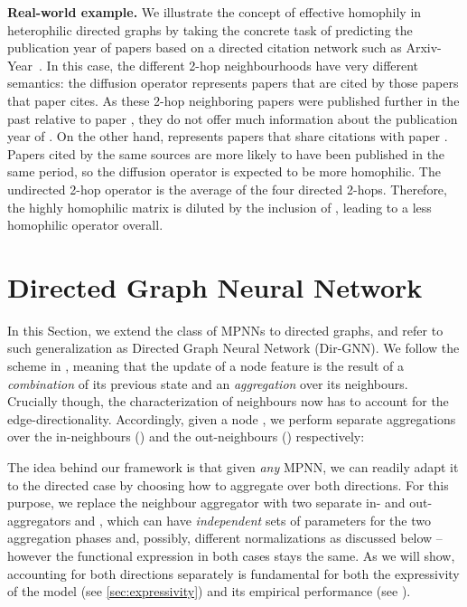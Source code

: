 \documentclass{article}
\newcommand\ours{Directed Graph Neural Network}
\newcommand\oursacro{Dir-GNN}
\theoremstyle{plain}
\theoremstyle{definition}
\theoremstyle{remark}
\begin{document}
\textbf{Real-world example.} We illustrate the concept of effective homophily in heterophilic directed graphs by taking the concrete task of predicting the publication year of papers based on a directed citation network such as Arxiv-Year~\cite{lim2021large}. 
In this case, the different 2-hop neighbourhoods have very different semantics: the diffusion operator  represents papers that are cited by those papers that paper  cites. As these 2-hop neighboring papers were published further in the past relative to paper , they do not offer much information about the publication year of .
On the other hand,  represents papers that share citations with paper . Papers cited by the same sources are more likely to have been published in the same period, so the diffusion operator  is expected to be more homophilic.
The undirected 2-hop operator  is the average of the four directed 2-hops. Therefore, the highly homophilic matrix  is diluted by the inclusion of , leading to a less homophilic operator overall.




 \section{\ours{}}
\label{sec:method}

In this Section, we extend the class of MPNNs to directed graphs, and refer to such generalization as \ours{} (\oursacro{}). We follow the scheme in , meaning that the update of a node feature is the result of a {\em combination} of its previous state and an {\em aggregation} over its neighbours. Crucially though, the characterization of neighbours now has to account for the edge-directionality. Accordingly, given a node , we perform separate aggregations over the in-neighbours () and the out-neighbours () respectively:

\noindent The idea behind our framework is that given {\em any} MPNN, we can readily adapt it to the directed case by choosing how to aggregate over both directions. For this purpose, we replace the neighbour aggregator  with two separate in- and out-aggregators  and , which can have {\em independent} sets of parameters for the two aggregation phases and, possibly, different normalizations as discussed below -- however the functional expression in both cases stays the same. As we will show, accounting for both directions separately is fundamental for both the expressivity of the model (see \cref{sec:expressivity}) and its empirical performance (see ).
\end{document}
